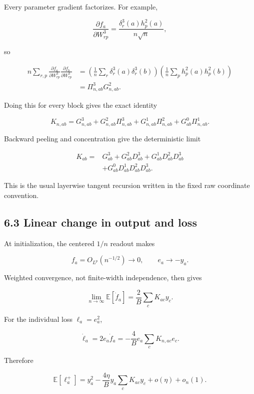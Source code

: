 Every parameter gradient factorizes. For example,

\[
\frac{\partial f_a}{\partial W^3_{rp}}
=
\frac{\delta_r^3(a)h_p^2(a)}{n\sqrt n},
\]


so

\[
\begin{aligned}
n\sum_{r,p}
\frac{\partial f_a}{\partial W^3_{rp}}
\frac{\partial f_b}{\partial W^3_{rp}}
&=
\left(\frac1n\sum_r
\delta_r^3(a)\delta_r^3(b)\right)
\left(\frac1n\sum_p
h_p^2(a)h_p^2(b)\right)
\\
&=
\Pi^3_{n,ab}G^2_{n,ab}.
\end{aligned}
\]


Doing this for every block gives the exact identity

\[
\boxed{
K_{n,ab}
=
G^3_{n,ab}
+G^2_{n,ab}\Pi^3_{n,ab}
+G^1_{n,ab}\Pi^2_{n,ab}
+G^0_{ab}\Pi^1_{n,ab}.
}
\]


Backward peeling and concentration give the deterministic limit

\[
\boxed{
\begin{aligned}
K_{ab}
={}&
G^3_{ab}
+G^2_{ab}D^3_{ab}
+G^1_{ab}D^2_{ab}D^3_{ab}
\\
&+
G^0_{ab}D^1_{ab}D^2_{ab}D^3_{ab}.
\end{aligned}
}
\]


This is the usual layerwise tangent recursion written in the fixed raw
coordinate convention.

\subsection*{6.3 Linear change in output and loss}


At initialization, the centered \(1/n\) readout makes

\[
f_a=O_{L^p}(n^{-1/2})
\longrightarrow0,
\qquad
e_a\longrightarrow-y_a.
\]


Weighted convergence, not finite-width independence, then gives

\[
\lim_{n\to\infty}\mathbb E[\dot f_a]
=
\frac2B\sum_cK_{ac}y_c.
\]


For the individual loss \(\ell_a=e_a^2\),

\[
\dot\ell_a
=
2e_a\dot f_a
=
-\frac4B e_a\sum_cK_{n,ac}e_c.
\]


Therefore

\[
\boxed{
\mathbb E[\ell_a^+]
=
y_a^2
-\frac{4\eta}{B}
y_a\sum_cK_{ac}y_c
+o(\eta)+o_n(1).
}
\]


